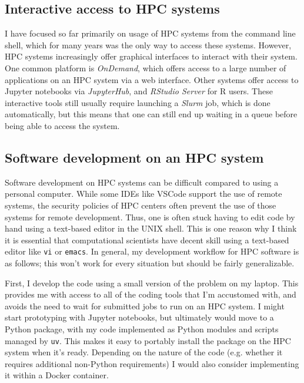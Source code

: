 \subsection{Interactive access to HPC systems}

I have focused so far primarily on usage of HPC systems from the command line shell, which for many years was the only way to access these systems. However, HPC systems increasingly offer graphical interfaces to interact with their system.  One common platform is \textit{OnDemand}, which offers access to a large number of applications on an HPC system via a web interface.  Other systems offer access to Jupyter notebooks via \textit{JupyterHub}, and \textit{RStudio Server} for R users.  These interactive tools still usually require launching a \textit{Slurm} job, which is done automatically, but this means that one can still end up waiting in a queue before being able to access the system.

\subsection{Software development on an HPC system}

Software development on HPC systems can be difficult compared to using a personal computer.  While some IDEs like VSCode support the use of remote systems, the security policies of HPC centers often prevent the use of those systems for remote development.  Thus, one is often stuck having to edit code by hand using a text-based editor in the UNIX shell.  This is one reason why I think it is essential that computational scientists have decent skill using a text-based editor like \texttt{vi} or \texttt{emacs}.  In general, my development workflow for HPC software is as follows; this won't work for every situation but should be fairly generalizable.

First, I develop the code using a small version of the problem on my laptop.  This provides me with access to all of the coding tools that I'm accustomed with, and avoids the need to wait for submitted jobs to run on an HPC system.  I might start prototyping with Jupyter notebooks, but ultimately would move to a Python package, with my code implemented as Python modules and scripts managed by \texttt{uv}.  This makes it easy to portably install the package on the HPC system when it's ready.  Depending on the nature of the code (e.g. whether it requires additional non-Python requirements) I would also consider implementing it within a Docker container.

